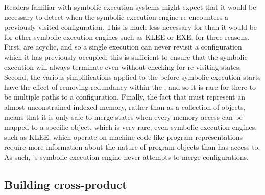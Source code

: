 Readers familiar with symbolic execution systems might expect that it
would be necessary to detect when the symbolic execution engine
re-encounters a previously visited configuration.  This is much less
necessary for {\technique} than it would be for other symbolic
execution engines such as KLEE\needCite{} or EXE\needCite{}, for three
reasons.  First, {\technique} {\StateMachines} are acyclic, and so a
single execution can never revisit a configuration which it has
previously occupied; this is sufficient to ensure that the symbolic
execution will always terminate even without checking for re-visiting
states.  Second, the various simplifications applied to the
{\StateMachines} before symbolic execution starts have the effect of
removing redundancy within the {\StateMachines}, and so it is rare for
there to be multiple paths to a configuration.  Finally, the fact that
{\technique} must represent an almost unconstrained indexed memory,
rather than as a collection of objects, means that it is only safe to
merge states when every memory access can be mapped to a specific
object, which is very rare; even symbolic execution engines, such as KLEE, which
operate on machine code-like program representations require more
information about the nature of program objects than {\technique} has
access to.  As such, {\implementation}'s symbolic execution engine
never attempts to merge configurations.

\subsection{Building cross-product {\StateMachines}}
\label{sect:using:build_cross_product}


